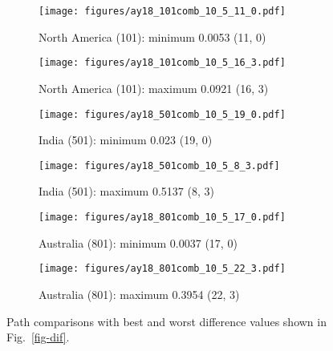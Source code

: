 \begin{figure*}
	\centering
	\begin{subfigure}{.42\textwidth} %
		\texttt{[image: figures/ay18\_101comb\_10\_5\_11\_0.pdf]}
		\caption{North America (101): minimum 0.0053 (11, 0)}\label{fig-nac-105110}
	\end{subfigure}
	\begin{subfigure}{.42\textwidth} %
		\texttt{[image: figures/ay18\_101comb\_10\_5\_16\_3.pdf]}
		\caption{North America (101): maximum 0.0921 (16, 3)}\label{fig-nac-105163}
	\end{subfigure}
	\vspace{.1em}
	\begin{subfigure}{.42\textwidth}
		\texttt{[image: figures/ay18\_501comb\_10\_5\_19\_0.pdf]}
		\caption{India (501): minimum 0.023 (19, 0)}\label{fig-ind-105190}
	\end{subfigure}
	\begin{subfigure}{.42\textwidth}
		\texttt{[image: figures/ay18\_501comb\_10\_5\_8\_3.pdf]}
		\caption{India (501): maximum 0.5137 (8, 3)}\label{fig-ind-10583}
	\end{subfigure}
	\vspace{.1em}
	\begin{subfigure}{.42\textwidth}
		\texttt{[image: figures/ay18\_801comb\_10\_5\_17\_0.pdf]}
		\caption{Australia (801): minimum 0.0037 (17, 0)}\label{fig-au-105170}
	\end{subfigure}
	\begin{subfigure}{.42\textwidth}
		\texttt{[image: figures/ay18\_801comb\_10\_5\_22\_3.pdf]}
		\caption{Australia (801): maximum 0.3954 (22, 3)}\label{fig-au-105223}
	\end{subfigure}
	\caption[Best and worst differences with test (10 Myr bin, 5 Myr
step)]{Path comparisons with best and worst difference values shown in
Fig.~\ref{fig-dif}.}\label{fig-difbw}
\end{figure*}

